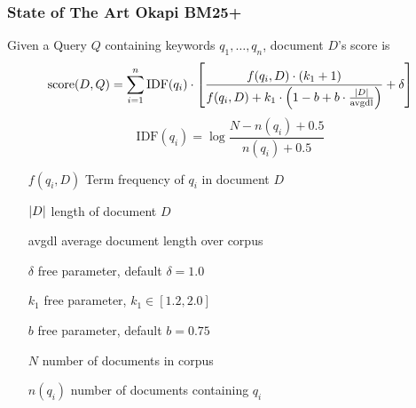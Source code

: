 \documentclass[11pt]{article}
\DeclarePairedDelimiter\abs{\lvert}{\rvert}
\begin{document}
\subsubsection{State of The Art Okapi BM25+}
Given a Query $Q$ containing keywords $q_1,\dots,q_n$, document $D$'s score is
\begin{equation*}
	\text{score}(D,Q) = \sum_{i=1}^{n}\text{IDF}(q_i) \cdot \left[ \frac{f(q_i,D)\cdot (k_1 + 1)}{f(q_i, D) + k_1\cdot\left( 1 - b + b\cdot\frac{\abs{D}}{\text{avgdl}} \right)} + \delta \right]
\end{equation*}
\begin{equation*}
	\text{IDF}(q_i) = \log \frac{N - n(q_i) + 0.5}{n(q_i) + 0.5}
\end{equation*}
\begin{itemize}[leftmargin=*, labelindent=2cm, labelsep=1cm, noitemsep,nosep]
	\item[$f(q_i,D)$] Term frequency of $q_i$ in document $D$
	\item[$\abs{D}$] length of document $D$
	\item[avgdl] average document length over corpus
	\item[$\delta$] free parameter, default $\delta = 1.0$
	\item[$k_1$] free parameter, $k_1 \in [1.2, 2.0]$
	\item[$b$] free parameter, default $b = 0.75$
	\item[$N$] number of documents in corpus
	\item[$n(q_i)$] number of documents containing $q_i$
\end{itemize}
\end{document}
